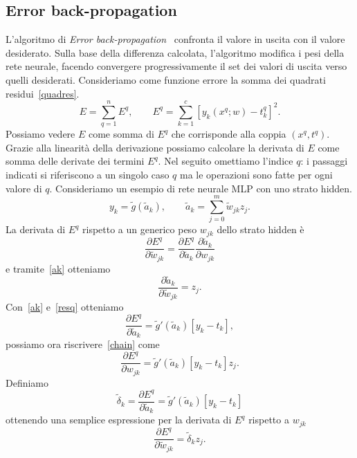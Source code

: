 \documentclass[11pt,a4paper,twoside,
openright]{book}
\begin{document}
\subsection*{Error back-propagation}
L'algoritmo di \textit{Error back-propagation}~\cite{Rumelhart20081B} confronta il valore in uscita con il valore desiderato. Sulla base della differenza calcolata, l'algoritmo modifica i pesi della rete neurale, facendo convergere progressivamente il set dei valori di uscita verso quelli desiderati.
Consideriamo come funzione errore la somma dei quadrati residui~\eqref{quadres}.
\begin{equation}
E = \sum\limits_{q=1}^n E^{q}, \qquad
E^q = \sum\limits_{k=1}^c [y_k (x^q;w) - t_{k}^{q}]^2.
\label{resq}
\end{equation}
Possiamo vedere $E$ come somma di $E^q$ che corrisponde alla coppia $(x^q,t^q)$. Grazie alla linearità della derivazione possiamo calcolare la derivata di $E$ come somma delle derivate dei termini $E^q$. Nel seguito omettiamo l'indice $q$: i passaggi indicati si riferiscono a un singolo caso $q$ ma le operazioni sono fatte per ogni valore di $q$. Consideriamo un esempio di rete neurale MLP con uno strato hidden.
\begin{equation}
y_k=\tilde{g}(\tilde{a}_k), \qquad
 \tilde{a}_k=\sum\limits_{j=0}^m \tilde{w}_{jk}z_j.
\label{ak}
\end{equation}
La derivata di $E^q$ rispetto a un generico peso $w_{jk}$ dello strato hidden è
\begin{equation}
\frac{\partial E^q}{\partial \tilde{w}_{jk}}=\frac{\partial E^q}{\partial \tilde{a}_k}\frac{\partial \tilde{a}_k}{\partial w_{jk}}
\label{chain}
\end{equation}
e tramite~\eqref{ak} otteniamo
\begin{equation}
\frac{\partial \tilde{a}_k}{\partial \tilde{w}_{jk}}=z_j.
\label{chain1}
\end{equation}
Con~\eqref{ak} e~\eqref{resq} otteniamo
\begin{equation}
\frac{\partial E^q}{\partial \tilde{a}_k}=\tilde{g}'(\tilde{a}_k)[y_k-t_k],
\label{chain2}
\end{equation}
possiamo ora riscrivere~\eqref{chain} come
\begin{equation}
\frac{\partial E^q}{\partial w_{jk}}=\tilde{g}'(\tilde{a}_k)[y_k-t_k]z_j.
\label{chain2}
\end{equation}
Definiamo
\begin{equation}
\tilde{\delta}_k = \frac{\partial E^q}{\partial \tilde{a}_k}=\tilde{g}'(\tilde{a}_k)[y_k-t_k]
\label{delta}
\end{equation}
ottenendo una semplice espressione per la derivata di $E^q$ rispetto a $w_{jk}$
\begin{equation}
\frac{\partial E^q}{\partial \tilde{w}_{jk}}=\tilde{\delta}_k z_j.
\label{deltaz}
\end{equation}
\end{document}
